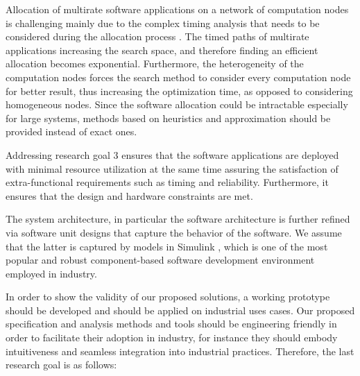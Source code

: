 \begin{researchgoal}
\end{researchgoal}

Allocation of multirate software applications on a network of computation nodes is challenging mainly due to the complex timing analysis that needs to be considered during the allocation process \cite{Mahmud5222, mubeen2013support}. The timed paths of multirate applications increasing the search space, and therefore finding an efficient allocation becomes exponential. Furthermore, the heterogeneity of the computation nodes forces the search method to consider every computation node for better result, thus increasing the optimization time, as opposed to considering homogeneous nodes. Since the software allocation could be intractable especially for large systems, methods based on heuristics and approximation should be provided instead of exact ones.

Addressing research goal 3 ensures that the software applications are deployed with minimal resource utilization at the same time assuring the satisfaction of extra-functional requirements such as timing and reliability. Furthermore, it ensures that the design and hardware constraints are met. 

The system architecture, in particular the software architecture is further refined via software unit designs that capture the behavior of the software. We assume that the latter is captured by models in Simulink \cite{JamesB.Dabney2003MasteringSimulink}, which is one of the most popular and robust component-based software development environment employed in industry. 



In order to show the validity of our proposed solutions, a working prototype should be developed and should be applied on industrial uses cases. Our proposed specification and analysis methods and tools should be engineering friendly in order to facilitate their adoption in industry, for instance they should embody intuitiveness and seamless integration into industrial practices. Therefore, the last research goal is as follows:
\begin{researchgoal}
\end{researchgoal}

